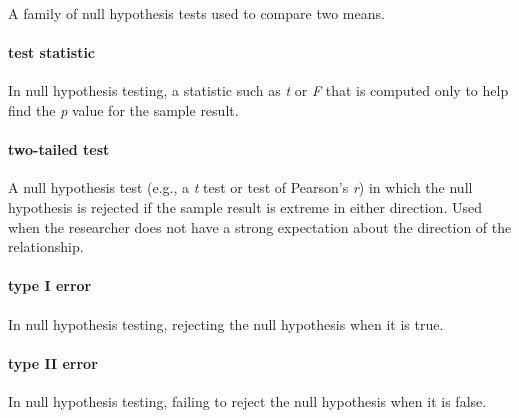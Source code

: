 \documentclass[
]{krantz}
\begin{document}
A family of null hypothesis tests used to compare two means.

\hypertarget{test-statistic}{%
\paragraph*{test statistic}\label{test-statistic}}

In null hypothesis testing, a statistic such as \emph{t} or \emph{F} that is computed only to help find the \emph{p} value for the sample result.

\hypertarget{two-tailed-test}{%
\paragraph*{two-tailed test}\label{two-tailed-test}}

A null hypothesis test (e.g., a \emph{t} test or test of Pearson's \emph{r}) in which the null hypothesis is rejected if the sample result is extreme in either direction. Used when the researcher does not have a strong expectation about the direction of the relationship.

\hypertarget{type-i-error}{%
\paragraph*{type I error}\label{type-i-error}}

In null hypothesis testing, rejecting the null hypothesis when it is true.

\hypertarget{type-ii-error}{%
\paragraph*{type II error}\label{type-ii-error}}

In null hypothesis testing, failing to reject the null hypothesis when it is false.
\end{document}
